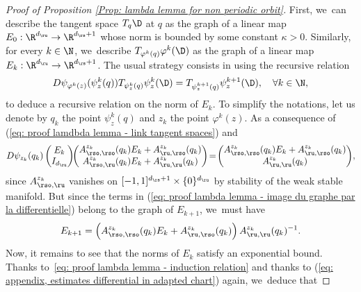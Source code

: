 \begin{appendix}
\begin{proof}[Proof of Proposition \ref{Prop: lambda lemma for non periodic orbit}]
First, we~can describe the tangent space $T_q \D$ at $q$ as the graph of a linear map $E_0: \R^{d_\ru} \to \R^{d_\rs + 1}$ whose norm is bounded by some constant $\kappa > 0$. Similarly, for every $k \in \N$, we~describe $T_{\varphi^k (q)} \varphi^k (\D)$ as the graph of a linear map $E_{k}: \R^{d_\ru} \to \R^{d_\rs +1}$. The usual strategy consists in using the recursive relation
\begin{equation}\label{eq: proof lamdbda lemma - link tangent spaces}
D \psi_{\varphi^k (z)} (\psi_{z}^k (q)) T_{\psi_{z}^k (q)} \psi_{z}^k (\D)
= T_{\psi_{z}^{k+1} (q)} \psi_{z}^{k+1}(\D), \quad \forall k \in \N,
\end{equation}
to deduce a recursive relation on the norm of $E_{k}$. To simplify the notations, let us denote by $q_k$ the point $\psi_{z}^k (q)$ and $z_k$ the point $\varphi^k (z)$. As a consequence of (\ref{eq: proof lamdbda lemma - link tangent spaces}) and
\begin{equation}\label{eq: proof lambda lemma - image du graphe par la differentielle}
D \psi_{z_k} (q_k) \begin{pmatrix}
E_k \\
I_{d_\ru} \\
\end{pmatrix}
\!\! \begin{pmatrix}
A_{\rso,\rso}^{z_k} (q_k) E_k+ A_{\ru,\rso}^{z_k} (q_k) \\
A_{\rso,\ru}^{z_k} (q_k) E_k + A_{\ru,\ru}^{z_k} (q_k)
\end{pmatrix}
\!=\! \begin{pmatrix}
A_{\rso,\rso}^{z_k} (q_k)E_k + A_{\ru,\rso}^{z_k} (q_k) \\
A_{\ru,\ru}^{z_k} (q_k)
\end{pmatrix}\!,
\end{equation}
since $ A_{\rso,\ru}^{z_k}$ vanishes on $[-1,1]^{d_\rs + 1}\times \{0\}^{d_\ru} $ by stability of the weak stable manifold. But since the terms in (\ref{eq: proof lambda lemma - image du graphe par la differentielle}) belong to the graph of $E_{k+1}$, we~must have
\begin{equation}\label{eq: proof lambda lemma - induction relation}
E_{k+1} = \left(A_{\rso,\rso}^{z_k} (q_k)E_k + A_{\ru,\rso}^{z_k} (q_k) \right) A_{\ru,\ru}^{z_k} (q_k)^{-1}.
\end{equation}
Now, it remains to see that the norms of $E_k$ satisfy an exponential bound. Thanks to~\eqref{eq: proof lambda lemma - induction relation} and thanks to (\ref{eq: appendix, estimates differential in adapted chart}) again, we~deduce that

\end{proof}
\end{appendix}
